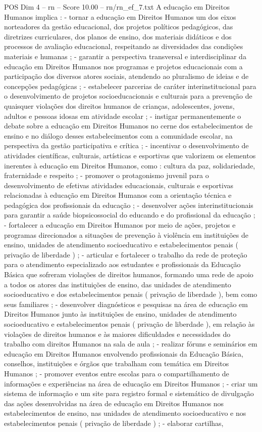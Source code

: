 \begin{textsample}{POS Dim 4 – rn – Score 10.00 – rn/rn\_ef\_7.txt}
A educação em Direitos Humanos implica : - tornar a educação em Direitos Humanos um dos eixos norteadores da gestão educacional, dos projetos políticos pedagógicos, das diretrizes curriculares, dos planos de ensino, dos materiais didáticos e dos processos de avaliação educacional, respeitando as diversidades das condições materiais e humanas ; - garantir a perspectiva transversal e interdisciplinar da educação em Direitos Humanos nos programas e projetos educacionais com a participação dos diversos atores sociais, atendendo ao pluralismo de ideias e de concepções pedagógicas ; - estabelecer parcerias de caráter interinstitucional para o desenvolvimento de projetos socioeducacionais e culturais para a prevenção de quaisquer violações dos direitos humanos de crianças, adolescentes, jovens, adultos e pessoas idosas em atividade escolar ; - instigar permanentemente o debate sobre a educação em Direitos Humanos no cerne dos estabelecimentos de ensino e no diálogo desses estabelecimentos com a comunidade escolar, na perspectiva da gestão participativa e crítica ; - incentivar o desenvolvimento de atividades científicas, culturais, artísticas e esportivas que valorizem os elementos inerentes à educação em Direitos Humanos, como : cultura da paz, solidariedade, fraternidade e respeito ; - promover o protagonismo juvenil para o desenvolvimento de efetivas atividades educacionais, culturais e esportivas relacionadas à educação em Direitos Humanos com a orientação técnica e pedagógica dos profissionais da educação ; - desenvolver ações interinstitucionais para garantir a saúde biopsicossocial do educando e do profissional da educação ; - fortalecer a educação em Direitos Humanos por meio de ações, projetos e programas direcionados a situações de prevenção à violência em instituições de ensino, unidades de atendimento socioeducativo e estabelecimentos penais ( privação de liberdade ) ; - articular e fortalecer o trabalho da rede de proteção para o atendimento especializado aos estudantes e profissionais da Educação Básica que sofreram violações de direitos humanos, formando uma rede de apoio a todos os atores das instituições de ensino, das unidades de atendimento socioeducativo e dos estabelecimentos penais ( privação de liberdade ), bem como seus familiares ; - desenvolver diagnósticos e pesquisas na área de educação em Direitos Humanos junto às instituições de ensino, unidades de atendimento socioeducativo e estabelecimentos penais ( privação de liberdade ), em relação às violações de direitos humanos e às maiores dificuldades e necessidades do trabalho com direitos Humanos na sala de aula ; - realizar fóruns e seminários em educação em Direitos Humanos envolvendo profissionais da Educação Básica, conselhos, instituições e órgãos que trabalham com temática em Direitos Humanos ; - promover eventos entre escolas para o compartilhamento de informações e experiências na área de educação em Direitos Humanos ; - criar um sistema de informação e um site para registro formal e sistemático de divulgação das ações desenvolvidas na área de educação em Direitos Humanos nos estabelecimentos de ensino, nas unidades de atendimento socioeducativo e nos estabelecimentos penais ( privação de liberdade ) ; - elaborar cartilhas, 
\end{textsample}

